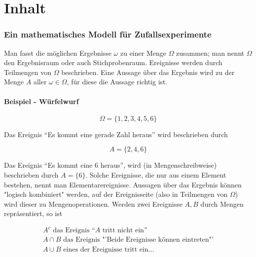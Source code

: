 



\part{Inhalt}

\section{Ein mathematisches Modell für Zufallsexperimente}

Man fasst die möglichen Ergebnisse $\omega$ zu einer Menge $\Omega$ zusammen; man nennt $\Omega$ den Ergebnisraum oder auch Stichprobenraum. Ereignisse werden durch Teilmengen von $\Omega$ beschrieben.
Eine Aussage über das Ergebnis wird zu der Menge $A$ aller $\omega \in \Omega$, für diese die Aussage richtig ist.

\subsection{Beispiel - Würfelwurf}

\begin{displaymath}
\Omega = \{1,2,3,4,5,6\}
\end{displaymath}

Das Ereignis ``Es kommt eine gerade Zahl heraus'' wird beschrieben durch

\begin{displaymath}
A = \{2,4,6\}
\end{displaymath}

Das Ereignis ``Es kommt eine 6 heraus'', wird (in Mengenschreibweise) beschrieben durch $A = \{6\}$.
Solche Ereignisse, die nur aus einem Element bestehen, nennt man Elementarereignisse.
Aussagen über das Ergebnis können "logisch kombiniert" werden, auf der Ereignisseite (also in Teilmengen von $\Omega$) wird dieser zu Mengenoperationen. Werden zwei Ereignisse $A, B$ durch Mengen repräsentiert, so ist

\begin{eqnarray*}
A^c \text{ das Ereignis ``$A$ tritt nicht ein''}\\
A \cap B \text{ das Ereignis "'Beide Ereignisse können eintreten"'}\\
A \cup B \text{ eines der Ereignisse tritt ein}
\ldots
\end{eqnarray*}

